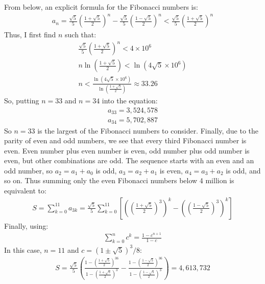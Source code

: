 \documentclass{article}
\begin{document}
From below, an explicit formula for the Fibonacci numbers is:
\begin{gather*}
	a_{n} = \frac{\sqrt{5}}{5}\left(\frac{1 + \sqrt{5}}{2}\right)^{n} -\frac{\sqrt{5}}{5}\left(\frac{1 - \sqrt{5}}{2}\right)^{n} < \frac{\sqrt{5}}{5}\left(\frac{1 + \sqrt{5}}{2}\right)^{n}
\end{gather*}
Thus, I first find $n$ such that:
\begin{gather*}
	\frac{\sqrt{5}}{5}\left(\frac{1 + \sqrt{5}}{2}\right)^{n} < 4 \times 10^{6}\\
	n\ln\left(\frac{1 + \sqrt{5}}{2}\right) < \ln\left(4\sqrt{5} \times 10^{6}\right)\\
	n < \frac{\ln\left(4\sqrt{5} \times 10^{6}\right)}{\ln\left(\frac{1 + \sqrt{5}}{2}\right)} \approx 33.26
\end{gather*}
So, putting $n = 33$ and $n = 34$ into the equation:
\begin{gather*}
	a_{33} = 3,524,578\\
	a_{34} = 5,702,887
\end{gather*}
So $n = 33$ is the largest of the Fibonacci numbers to consider. Finally, due to the parity of even and odd numbers, we see that every third Fibonacci number is even. Even number plus even number is even, odd number plus odd number is even, but other combinations are odd. The sequence starts with an even and an odd number, so $a_{2} = a_{1} + a_{0}$ is odd, $a_{3} = a_{2} + a_{1}$ is even, $a_{4} = a_{3} + a_{2}$ is odd, and so on. Thus summing only the even Fibonacci numbers below 4 million is equivalent to:
\begin{gather*}
	S = \sum_{k = 0}^{11}a_{3k} = \frac{\sqrt{5}}{5}\sum_{k = 0}^{11}\left[\left(\left(\frac{1 + \sqrt{5}}{2}\right)^{3}\right)^{k} - \left(\left(\frac{1 - \sqrt{5}}{2}\right)^{3}\right)^{k}\right]
\end{gather*}
Finally, using:
\begin{gather*}
	\sum_{k = 0}^{n}c^{k} = \frac{1 - c^{n + 1}}{1 - c}
\end{gather*}
In this case, $n = 11$ and $c = (1 \pm \sqrt{5})^{3}/8$:
\begin{gather*}
	S = \frac{\sqrt{5}}{5}\left(\frac{1 - \left(\frac{1 + \sqrt{5}}{2}\right)^{36}}{1 - \left(\frac{1 + \sqrt{5}}{2}\right)^{3}} - \frac{1 - \left(\frac{1 - \sqrt{5}}{2}\right)^{36}}{1 - \left(\frac{1 - \sqrt{5}}{2}\right)^{3}}\right) = 4,613,732
\end{gather*}
\end{document}
